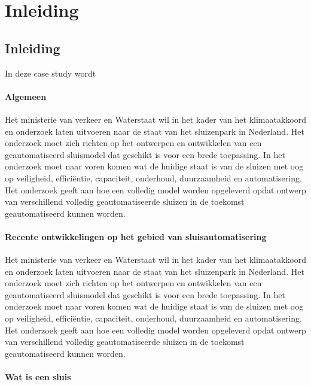 \chapter{Inleiding}
\label{chapter:Inleiding}
\thispagestyle{myheadings}



	\newpage
\section{Inleiding}
In deze case study wordt %

\subsubsection{Algemeen}

Het ministerie van verkeer en Waterstaat wil in het kader van het klimaatakkoord en onderzoek laten uitvoeren naar de staat van het sluizenpark in Nederland. Het onderzoek moet zich richten op het ontwerpen en ontwikkelen van een geautomatiseerd sluismodel dat geschikt is voor een brede toepassing. In het onderzoek moet naar voren komen wat de huidige staat is van de sluizen met oog op veiligheid, efficiëntie, capaciteit, onderhoud, duurzaamheid en automatisering. Het onderzoek geeft aan hoe een volledig model worden opgeleverd opdat ontwerp van verschillend volledig geautomatiseerde sluizen in de toekomst geautomatiseerd kunnen worden.  

\subsubsection{Recente ontwikkelingen op het gebied van sluisautomatisering}

Het ministerie van verkeer en Waterstaat wil in het kader van het klimaatakkoord en onderzoek laten uitvoeren naar de staat van het sluizenpark in Nederland. Het onderzoek moet zich richten op het ontwerpen en ontwikkelen van een geautomatiseerd sluismodel dat geschikt is voor een brede toepassing. In het onderzoek moet naar voren komen wat de huidige staat is van de sluizen met oog op veiligheid, efficiëntie, capaciteit, onderhoud, duurzaamheid en automatisering. Het onderzoek geeft aan hoe een volledig model worden opgeleverd opdat ontwerp van verschillend volledig geautomatiseerde sluizen in de toekomst geautomatiseerd kunnen worden.  
\subsubsection{Wat is een sluis}

